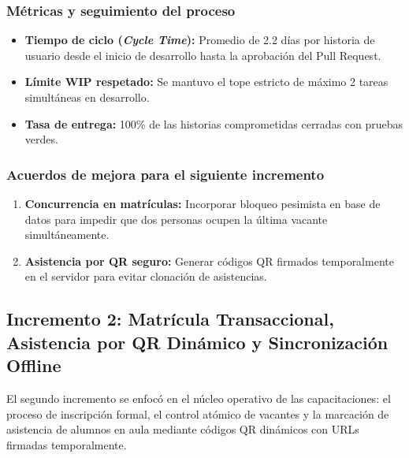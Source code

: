 \subsubsection{Métricas y seguimiento del proceso}
\begin{itemize}[nosep]
    \item \textbf{Tiempo de ciclo (\textit{Cycle Time}):} Promedio de 2.2 días por historia de usuario desde el inicio de desarrollo hasta la aprobación del Pull Request.
    \item \textbf{Límite WIP respetado:} Se mantuvo el tope estricto de máximo 2 tareas simultáneas en desarrollo.
    \item \textbf{Tasa de entrega:} 100\% de las historias comprometidas cerradas con pruebas verdes.
\end{itemize}

\subsubsection{Acuerdos de mejora para el siguiente incremento}
\begin{enumerate}[nosep]
    \item \textbf{Concurrencia en matrículas:} Incorporar bloqueo pesimista en base de datos para impedir que dos personas ocupen la última vacante simultáneamente.
    \item \textbf{Asistencia por QR seguro:} Generar códigos QR firmados temporalmente en el servidor para evitar clonación de asistencias.
\end{enumerate}

\vspace{0.4cm}

\subsection{Incremento 2: Matrícula Transaccional, Asistencia por QR Dinámico y Sincronización Offline}

El segundo incremento se enfocó en el núcleo operativo de las capacitaciones: el proceso de inscripción formal, el control atómico de vacantes y la marcación de asistencia de alumnos en aula mediante códigos QR dinámicos con URLs firmadas temporalmente.

